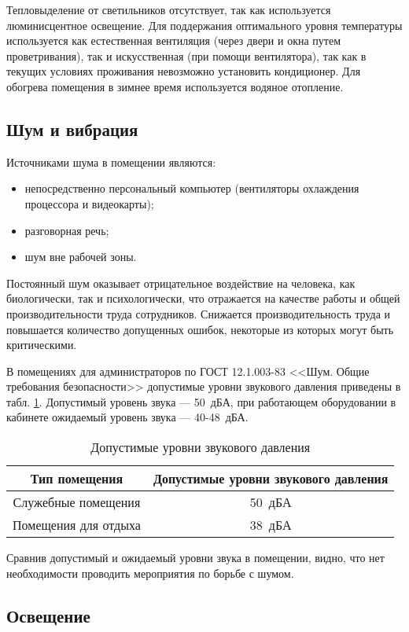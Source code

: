 Тепловыделение от светильников отсутствует, так как используется люминисцентное освещение.
Для поддержания оптимального уровня температуры используется как естественная вентиляция (через двери и окна путем проветривания), так и искусственная (при помощи вентилятора), так как в текущих условиях проживания невозможно установить кондиционер.
Для обогрева помещения в зимнее время используется водяное отопление.

\subsection{Шум и вибрация}

Источниками шума в помещении являются:
\begin{itemize}
  \item непосредственно персональный компьютер (вентиляторы охлаждения процессора и видеокарты);
  \item разговорная речь;
  \item шум вне рабочей зоны.
\end{itemize}

Постоянный шум оказывает отрицательное воздействие на человека, как биологически, так и психологически, что отражается на качестве работы и общей производительности труда сотрудников.
Снижается производительность труда и повышается количество допущенных ошибок, некоторые из которых могут быть критическими.

В помещениях для администраторов по ГОСТ 12.1.003-83 <<Шум. Общие требования безопасности>> допустимые уровни звукового давления приведены в табл. \ref{sound-tab}.
Допустимый уровень звука --- 50~дБА, при работающем оборудовании в кабинете ожидаемый уровень звука --- 40-48~дБА.
\begin{table}[H]
  \caption{Допустимые уровни звукового давления}\label{sound-tab}
  \begin{tabular}{|c|c|}
  \hline Тип помещения & Допустимые уровни звукового давления \\
  \hline Служебные помещения & 50~дБА \\
  \hline Помещения для отдыха & 38~дБА \\
  \hline 
  \end{tabular}
\end{table}

Сравнив допустимый и ожидаемый уровни звука в помещении, видно, что нет необходимости проводить мероприятия по борьбе с шумом.

\subsection{Освещение}


